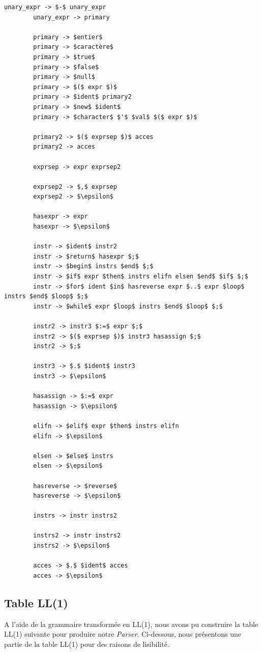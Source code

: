 \documentclass[french,a4paper]{article}
\begin{document}
\begin{lstlisting}[label={lst:lstlisting9}]
        unary_expr -> $-$ unary_expr
        unary_expr -> primary

        primary -> $entier$
        primary -> $caractère$
        primary -> $true$
        primary -> $false$
        primary -> $null$
        primary -> $($ expr $)$
        primary -> $ident$ primary2
        primary -> $new$ $ident$
        primary -> $character$ $'$ $val$ $($ expr $)$

        primary2 -> $($ exprsep $)$ acces
        primary2 -> acces

        exprsep -> expr exprsep2

        exprsep2 -> $,$ exprsep
        exprsep2 -> $\epsilon$

        hasexpr -> expr
        hasexpr -> $\epsilon$

        instr -> $ident$ instr2
        instr -> $return$ hasexpr $;$
        instr -> $begin$ instrs $end$ $;$
        instr -> $if$ expr $then$ instrs elifn elsen $end$ $if$ $;$
        instr -> $for$ ident $in$ hasreverse expr $..$ expr $loop$ instrs $end$ $loop$ $;$
        instr -> $while$ expr $loop$ instrs $end$ $loop$ $;$

        instr2 -> instr3 $:=$ expr $;$
        instr2 -> $($ exprsep $)$ instr3 hasassign $;$
        instr2 -> $;$

        instr3 -> $.$ $ident$ instr3
        instr3 -> $\epsilon$

        hasassign -> $:=$ expr
        hasassign -> $\epsilon$

        elifn -> $elif$ expr $then$ instrs elifn
        elifn -> $\epsilon$

        elsen -> $else$ instrs
        elsen -> $\epsilon$

        hasreverse -> $reverse$
        hasreverse -> $\epsilon$

        instrs -> instr instrs2

        instrs2 -> instr instrs2
        instrs2 -> $\epsilon$

        acces -> $.$ $ident$ acces
        acces -> $\epsilon$
    \end{lstlisting}

    \subsection{Table LL(1)}\label{subsec:table-ll(1)}

    A l'aide de la grammaire transformée en LL(1), nous avons pu construire la table LL(1) suivante pour produire notre \textit{Parser}.
    Ci-dessous, nous présentons une partie de la table LL(1) pour des raisons de lisibilité.
\end{document}
